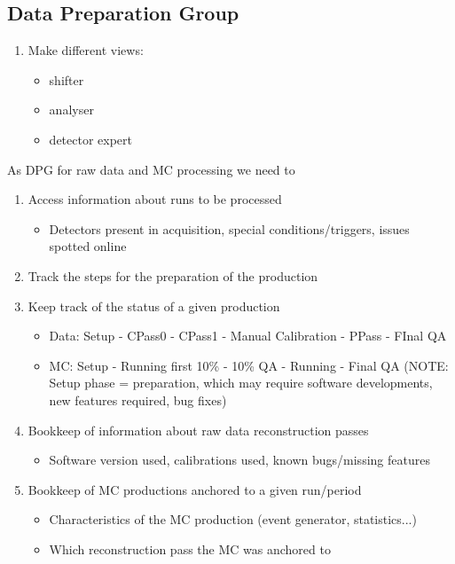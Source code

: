 \subsection{Data Preparation Group}
\begin{enumerate}
  \item Make different views:
  \begin{itemize}
    \item shifter
    \item analyser
    \item detector expert
  \end{itemize}
\end{enumerate}

As DPG for raw data and MC processing we need to
\begin{enumerate}
  \item Access information about runs to be processed
  \begin{itemize}
    \item Detectors present in acquisition, special conditions/triggers, issues
spotted online
    \end{itemize}
  \item Track the steps for the preparation of the production
  \item Keep track of the status of a given production
  \begin{itemize}
    \item Data: Setup - CPass0 - CPass1 - Manual Calibration - PPass - FInal QA
    \item MC: Setup - Running first 10\% - 10\% QA - Running - Final QA (NOTE: Setup phase = preparation, which may require software
developments, new features required, bug fixes)
  \end{itemize}
  \item Bookkeep of information about raw data reconstruction passes
  \begin{itemize}
    \item Software version used, calibrations used, known bugs/missing features
  \end{itemize}
  \item Bookkeep of MC productions anchored to a given run/period
  \begin{itemize}
    \item Characteristics of the MC production (event generator, statistics...)
    \item Which reconstruction pass the MC was anchored to
  \end{itemize}

\end{enumerate}
